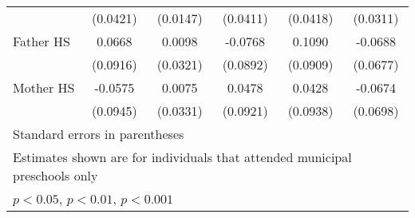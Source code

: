 \begin{table}[htbp]
\begin{tabular}{l*{5}{c}}
            &    (0.0421)         &    (0.0147)         &    (0.0411)         &    (0.0418)         &    (0.0311)         \\
\addlinespace
Father HS   &      0.0668         &      0.0098         &     -0.0768         &      0.1090         &     -0.0688         \\
            &    (0.0916)         &    (0.0321)         &    (0.0892)         &    (0.0909)         &    (0.0677)         \\
\addlinespace
Mother HS   &     -0.0575         &      0.0075         &      0.0478         &      0.0428         &     -0.0674         \\
            &    (0.0945)         &    (0.0331)         &    (0.0921)         &    (0.0938)         &    (0.0698)         \\
\bottomrule
\multicolumn{6}{l}{\footnotesize Standard errors in parentheses}\\
\multicolumn{6}{l}{\footnotesize Estimates shown are for individuals that attended municipal preschools only}\\
\multicolumn{6}{l}{\footnotesize \sym{*} \(p<0.05\), \sym{**} \(p<0.01\), \sym{***} \(p<0.001\)}\\
\end{tabular}
\end{table}
